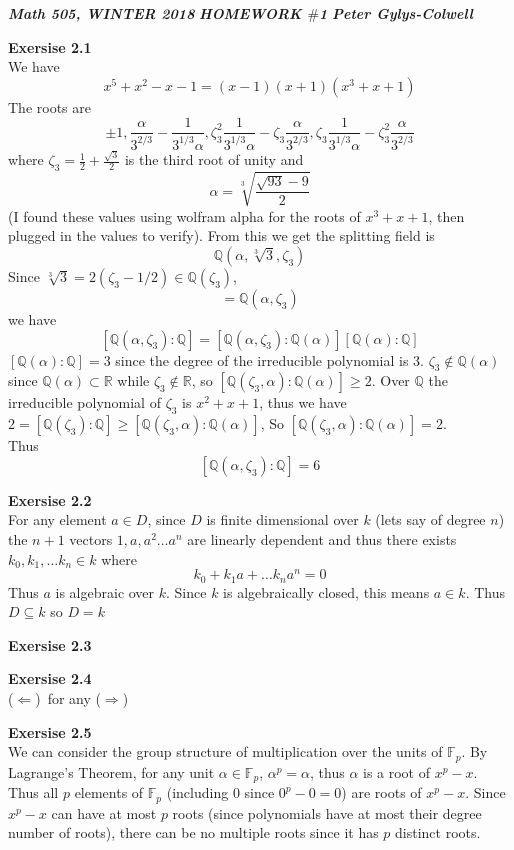 \documentclass[12pt]{article}
\newenvironment{ques}[1]{\textbf{Exersise #1}\vspace{1 mm}\\ }{\bigskip}
\theoremstyle{definition}
\newcommand{\R}{\mathbb R}
\newcommand{\Q}{\mathbb Q}
\newcommand{\F}{\mathbb F}
\renewcommand{\a}{\alpha}
\begin{document}
\noindent \textit{\textbf{Math 505, WINTER 2018}} \hspace{1.3cm}
\textit{\textbf{HOMEWORK $\#$1}} \hspace{1.3cm} \textit{\textbf{Peter
Gylys-Colwell}} 

\vspace{1cm}

\begin{ques}{2.1}
	We have
	$$x^5 + x^2 - x - 1 = (x - 1)(x + 1)(x^3 + x + 1)$$
	The roots are 
	$$\pm 1, \frac{\a}{3^{2/3}} - \frac{1}{3^{1/3}\a},
	\zeta_3^2\frac{1}{3^{1/3}\a}-\zeta_3\frac{\a}{3^{2/3}},
	\zeta_3\frac{1}{3^{1/3}\a}-\zeta_3^2\frac{\a}{3^{2/3}}$$ 
	where
	$\zeta_3 = \frac 1 2 + \frac {\sqrt 3} {2}$ is the third root of unity and
	$$\a = \sqrt[3]{\frac{\sqrt{93} - 9}{2}}$$
	(I found these values using wolfram alpha for the roots of $x^3 + x + 1$,
	then plugged in the values to verify). From this we get the splitting field
	is $$\Q(\a, \sqrt[3] 3, \zeta_3)$$ Since $\sqrt[3] 3 = 2(\zeta_3 - 1/2) \in
	\Q(\zeta_3)$, $$= \Q(\a, \zeta_3)$$ we have $$[\Q(\a,\zeta_3) : \Q] =
	[\Q(\a,\zeta_3) : \Q(\a)][\Q(\a):\Q]$$ $[\Q(\a): \Q] = 3$ since the degree
	of the irreducible polynomial is 3.  $\zeta_3 \notin \Q(\a)$ since $\Q(\a)
	\subset \R$ while $\zeta_3 \notin \R$, so $[\Q(\zeta_3,\a) : \Q(\a)] \geq
	2$. Over $\Q$ the irreducible polynomial of $\zeta_3$ is $x^2 + x + 1$,
	thus we have $2 = [\Q(\zeta_3) : \Q] \geq [\Q(\zeta_3,\a) : \Q(\a)]$, So
	$[\Q(\zeta_3,\a):\Q(\a)] = 2$.\\ Thus
	$$[\Q(\a,\zeta_3):\Q] = 6$$
\end{ques}

\begin{ques}{2.2}
	For any element $a \in D$, since $D$ is finite dimensional over $k$ (lets
	say of degree $n$) the $n +1$ vectors $1, a, a^2 \dots a^n$ are linearly
	dependent and thus there exists $k_0, k_1, \dots k_n \in k$ where
	$$k_0 + k_1a + \dots k_na^n = 0$$
	Thus $a$ is algebraic over $k$. Since $k$ is algebraically closed, this
	means $a \in k$. Thus $D \subseteq k$ so $D = k$
\end{ques}

\begin{ques}{2.3}
\end{ques}

\begin{ques}{2.4}
	($\Leftarrow$)\ for any 
	($\Rightarrow$)\
	
\end{ques}

\begin{ques}{2.5}
	We can consider the group structure of multiplication over the units of
	$\F_p$. By Lagrange's Theorem, for any unit $\a \in \F_p$, $\a^p = \a$,
	thus $\a$ is a root of $x^p - x$. Thus all $p$ elements of $\F_p$
	(including $0$ since $0^p - 0 = 0$) are roots of $x^p - x$. Since $x^p - x$
	can have at most $p$ roots (since polynomials have at most their degree
	number of roots), there can be no multiple roots since it has $p$ distinct
	roots.
\end{ques}
\end{document}
